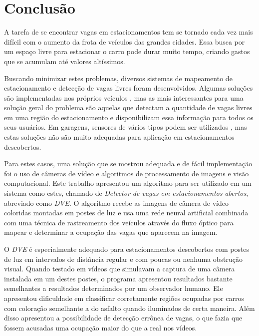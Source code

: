 \chapter{Conclusão}\label{cap:conclusao}

A tarefa de se encontrar vagas em estacionamentos tem se tornado cada vez mais difícil com o aumento da frota de veículos das grandes cidades. Essa busca por um espaço livre para estacionar o carro pode durar muito tempo, criando gastos que se acumulam até valores altíssimos.

Buscando minimizar estes problemas, diversos sistemas de mapeamento de estacionamento e detecção de vagas livres foram desenvolvidos. Algumas soluções são implementadas nos próprios veículos \cite{schmid2011parking}, mas as mais interessantes para uma solução geral do problema são aquelas que detectam a quantidade de vagas livres em uma região do estacionamento e disponibilizam essa informação para todos os seus usuários. Em garagens, sensores de vários tipos podem ser utilizados \cite{kianpisheh2012smart}\cite{wolff2006parking}\cite{lee2008intelligent}, mas estas soluções não são muito adequadas para aplicação em estacionamentos descobertos. 

Para estes casos, uma solução que se mostrou adequada e de fácil implementação foi o uso de câmeras de vídeo e algoritmos de processamento de imagens e visão computacional. Este trabalho apresentou um algoritmo para ser utilizado em um sistema como estes, chamado de \textit{Detector de vagas em estacionamentos abertos}, abreviado como \textit{DVE}. O algoritmo recebe as imagens de câmera de vídeo coloridas montadas em postes de luz e usa uma rede neural artificial combinada com uma técnica de rastreamento dos veículos através do fluxo óptico para mapear e determinar a ocupação das vagas que aparecem na imagem.

O \textit{DVE} é especialmente adequado para estacionamentos descobertos com postes de luz em intervalos de distância regular e com poucas ou nenhuma obstrução visual. Quando testado em vídeos que simulavam a captura de uma câmera instalada em um destes postes, o programa apresentou resultados bastante semelhantes a resultados determinados por um observador humano. Ele apresentou dificuldade em classificar corretamente regiões ocupadas por carros com coloração semelhante a do asfalto quando iluminados de certa maneira. Além disso apresentou a possibilidade de detecção errônea de vagas, o que fazia que fossem acusadas uma ocupação maior do que a real nos vídeos.

